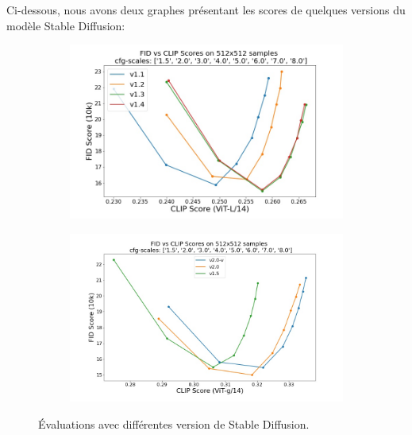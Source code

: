Ci-dessous, nous avons deux graphes présentant les scores de quelques versions du modèle Stable Diffusion:

\begin{figure}[H]
    \centering
    \begin{subfigure}[b]{0.49\textwidth}
        \centering
        \includegraphics[width=\textwidth]{./images/graph-sdv1.jpg}
        \caption{}
    \end{subfigure}
    \hfill
    \begin{subfigure}[b]{0.49\textwidth}
        \centering
        \includegraphics[width=\textwidth]{./images/graph-sdv2.jpg}
        \caption{}
    \end{subfigure}
    \caption{Évaluations avec différentes version de Stable Diffusion. \cite{rombach2021highresolution}}
    \label{fig:comparaison_sd}
\end{figure}



